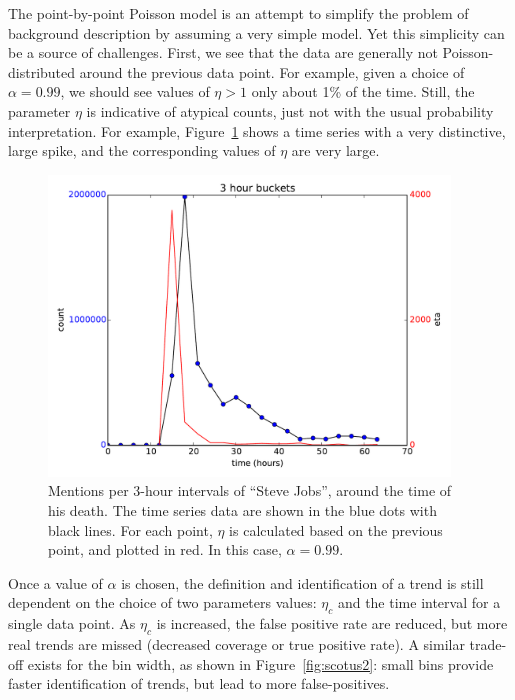 \documentclass{article}
\begin{document}
The point-by-point Poisson model is an attempt to simplify the problem of
background description by assuming a very simple model. Yet this
simplicity can be a source of challenges. First, we see that the data are
generally not Poisson-distributed around the previous data point. For example,
given a choice of $\alpha=0.99$, we should see values of $\eta>1$ only about 1\% of the
time. Still, the parameter $\eta$ is indicative of atypical counts, just not with
the usual probability interpretation. For example, Figure~\ref{fig:jobs} shows a time series with a
very distinctive, large spike, and the corresponding values of $\eta$ are very 
large.

\begin{figure}
\begin{center}
\includegraphics[width=0.95\textwidth]{fig/jobs.pdf}
\caption{Mentions per 3-hour intervals of “Steve Jobs”, around the time of his
death. The time series data are shown in the blue dots with black lines. For
each point, $\eta$ is calculated based on the previous point, and plotted in red.
In this case, $\alpha=0.99$. } 
\label{fig:jobs}
\end{center}
\end{figure}

Once a value of $\alpha$ is chosen, the definition and identification of a trend is
still dependent on the choice of two parameters values: $\eta_c$ and the time
interval for a single data point. As $\eta_c$ is increased, the false positive rate
are reduced, but more real trends are missed (decreased coverage or true
positive rate). A similar trade-off exists for the bin width, as shown in
Figure~\ref{fig:scotus2}: small bins provide faster identification of trends, but lead to
more false-positives.
\end{document}
